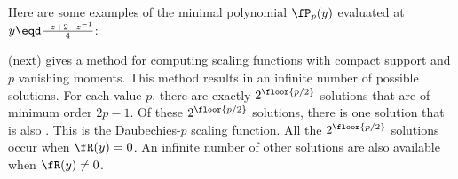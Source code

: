 \begin{example}
\label{tbl:Pyz}
Here are some examples of the minimal polynomial $\fP_p(y)$ evaluated at
$y\eqd\frac{-z+2-z^{-1}}{4}$:
\end{example}

 (next)
gives a method for computing scaling functions with compact support
and $p$ vanishing moments.
This method results in an infinite number of possible solutions.
For each value $p$, there are exactly
$2^\floor{p/2}$ solutions that are of minimum order
$2p-1$.
Of these $2^\floor{p/2}$ solutions, there is one solution that
is also .
This is the Daubechies-$p$ scaling function.
All the $2^\floor{p/2}$ solutions occur when
$\fR(y)=0$.
An infinite number of other solutions are also available when
$\fR(y)\ne 0$.

